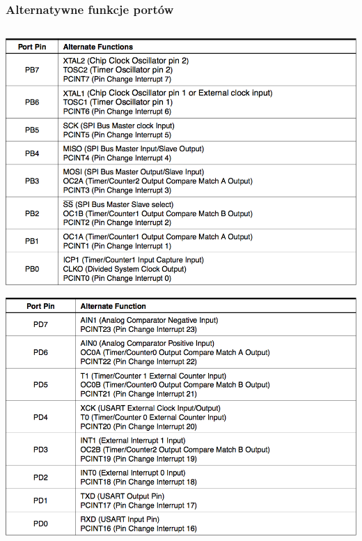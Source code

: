 \documentclass[8pt]{beamer}
\begin{document}
\begin{frame}
  \frametitle{Alternatywne funkcje portów}

  \begin{columns}
    \begin{column}[T]{5cm}
      \begin{center}
        \includegraphics[scale=0.3333]{images/port-b.png}
      \end{center}
      \begin{center}
        \includegraphics[scale=0.3333]{images/port-d.png}
      \end{center}
    \end{column}
    

\end{columns}
\end{frame}
\end{document}
